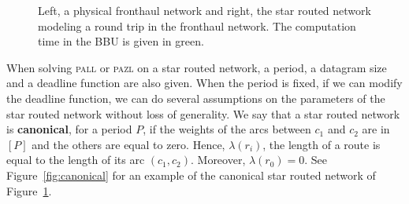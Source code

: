 \documentclass[a4paper,10pt]{article}
\newcommand\pazl{\textsc{pazl}\xspace}
\newcommand\pall{\textsc{pall}\xspace}
\begin{document}
\begin{figure}
\begin{center}
{\begin{tikzpicture}
\end{tikzpicture}
}




             \caption{Left, a physical fronthaul network and right, the star routed network modeling a round trip in the fronthaul network. The computation time in the BBU is given in green.}

	         \label{fig:star}
            \end{center}
	         \end{figure}
	         
  When solving \pall or \pazl on a star routed network, a period, a datagram size and a deadline function are also given. When the period is fixed, if we can modify the deadline function, we can do several assumptions on the parameters of the star routed network without loss of generality. We say that a star routed network is \textbf{canonical}, for a period $P$, if the weights of the arcs between $c_1$ and $c_2$ are in $[P]$ and the others are equal to zero. Hence, $\lambda(r_i)$, the length of a route is equal to the length of its arc $(c_1,c_2)$. Moreover, $\lambda(r_0) = 0$. See Figure~\ref{fig:canonical} for an example of the canonical star routed network of Figure~\ref{fig:star}.  
  
\end{document}
